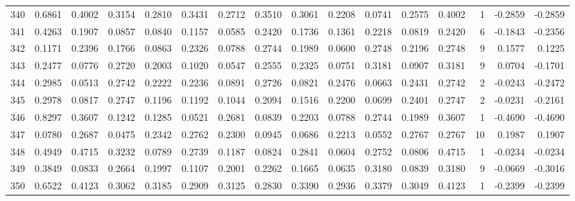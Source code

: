 \begin{tabular}{lrrrrrrrrrrrrrrr}
340 &      0.6861 &  0.4002 &  0.3154 &  0.2810 &  0.3431 &  0.2712 &  0.3510 &  0.3061 &  0.2208 &  0.0741 &   0.2575 &     0.4002 &      1 &                   -0.2859 &                    -0.2859 \\
341 &      0.4263 &  0.1907 &  0.0857 &  0.0840 &  0.1157 &  0.0585 &  0.2420 &  0.1736 &  0.1361 &  0.2218 &   0.0819 &     0.2420 &      6 &                   -0.1843 &                    -0.2356 \\
342 &      0.1171 &  0.2396 &  0.1766 &  0.0863 &  0.2326 &  0.0788 &  0.2744 &  0.1989 &  0.0600 &  0.2748 &   0.2196 &     0.2748 &      9 &                    0.1577 &                     0.1225 \\
343 &      0.2477 &  0.0776 &  0.2720 &  0.2003 &  0.1020 &  0.0547 &  0.2555 &  0.2325 &  0.0751 &  0.3181 &   0.0907 &     0.3181 &      9 &                    0.0704 &                    -0.1701 \\
344 &      0.2985 &  0.0513 &  0.2742 &  0.2222 &  0.2236 &  0.0891 &  0.2726 &  0.0821 &  0.2476 &  0.0663 &   0.2431 &     0.2742 &      2 &                   -0.0243 &                    -0.2472 \\
345 &      0.2978 &  0.0817 &  0.2747 &  0.1196 &  0.1192 &  0.1044 &  0.2094 &  0.1516 &  0.2200 &  0.0699 &   0.2401 &     0.2747 &      2 &                   -0.0231 &                    -0.2161 \\
346 &      0.8297 &  0.3607 &  0.1242 &  0.1285 &  0.0521 &  0.2681 &  0.0839 &  0.2203 &  0.0788 &  0.2744 &   0.1989 &     0.3607 &      1 &                   -0.4690 &                    -0.4690 \\
347 &      0.0780 &  0.2687 &  0.0475 &  0.2342 &  0.2762 &  0.2300 &  0.0945 &  0.0686 &  0.2213 &  0.0552 &   0.2767 &     0.2767 &     10 &                    0.1987 &                     0.1907 \\
348 &      0.4949 &  0.4715 &  0.3232 &  0.0789 &  0.2739 &  0.1187 &  0.0824 &  0.2841 &  0.0604 &  0.2752 &   0.0806 &     0.4715 &      1 &                   -0.0234 &                    -0.0234 \\
349 &      0.3849 &  0.0833 &  0.2664 &  0.1997 &  0.1107 &  0.2001 &  0.2262 &  0.1665 &  0.0635 &  0.3180 &   0.0839 &     0.3180 &      9 &                   -0.0669 &                    -0.3016 \\
350 &      0.6522 &  0.4123 &  0.3062 &  0.3185 &  0.2909 &  0.3125 &  0.2830 &  0.3390 &  0.2936 &  0.3379 &   0.3049 &     0.4123 &      1 &                   -0.2399 &                    -0.2399 \\

\end{tabular}
